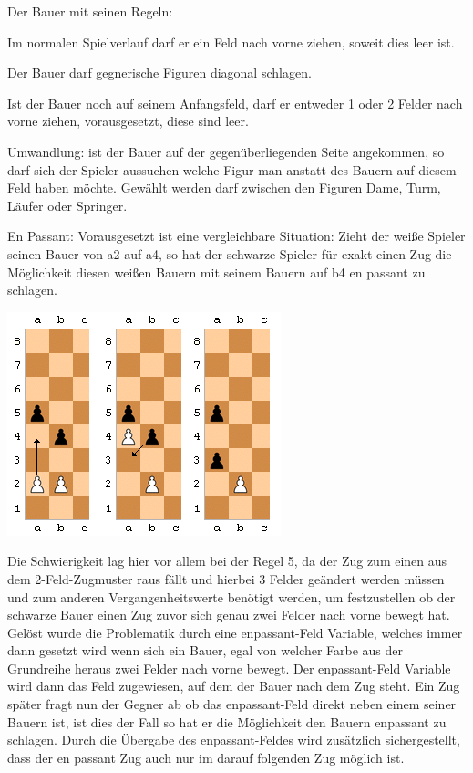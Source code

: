 \documentclass[a4paper, 12pt]{article}
\begin{document}
Der Bauer mit seinen Regeln:
\begin{compactenum}
\item{Im normalen Spielverlauf darf er ein Feld nach vorne ziehen, soweit dies leer ist.}
\item{Der Bauer darf gegnerische Figuren diagonal schlagen.}
\item{Ist der Bauer noch auf seinem Anfangsfeld, darf er entweder 1 oder 2 Felder nach vorne ziehen, vorausgesetzt, diese sind leer.}
\item{Umwandlung: ist der Bauer auf der gegenüberliegenden Seite angekommen, so darf sich der Spieler aussuchen welche Figur man anstatt des Bauern auf diesem Feld haben möchte.
Gewählt werden darf zwischen den Figuren Dame, Turm, Läufer oder Springer.}

\newpage

\item{En Passant: Vorausgesetzt ist eine vergleichbare Situation: Zieht der weiße Spieler seinen Bauer von a2 auf a4, so hat der schwarze Spieler für exakt einen Zug die Möglichkeit diesen weißen Bauern mit seinem Bauern auf b4 en passant zu schlagen.\cite{enpassant}}
\end{compactenum}

\begin{center}
\includegraphics[scale=0.9]{images/enpassant.png}
\end{center}

Die Schwierigkeit lag hier vor allem bei der Regel 5, da der Zug zum einen aus dem 2-Feld-Zugmuster raus fällt und hierbei 3 Felder geändert werden müssen und zum anderen Vergangenheitswerte benötigt werden, um festzustellen ob der schwarze Bauer einen Zug zuvor sich genau zwei Felder nach vorne bewegt hat.
Gelöst wurde die Problematik durch eine enpassant-Feld Variable, welches immer dann gesetzt wird wenn sich ein Bauer, egal von welcher Farbe aus der Grundreihe heraus zwei Felder nach vorne bewegt.
Der enpassant-Feld Variable wird dann das Feld zugewiesen, auf dem der Bauer nach dem Zug steht.
Ein Zug später fragt nun der Gegner ab ob das enpassant-Feld direkt neben einem seiner Bauern ist, ist dies der Fall so hat er die Möglichkeit den Bauern enpassant zu schlagen. Durch die Übergabe des enpassant-Feldes wird zusätzlich sichergestellt, dass der en passant Zug auch nur im darauf folgenden Zug möglich ist.
\end{document}
